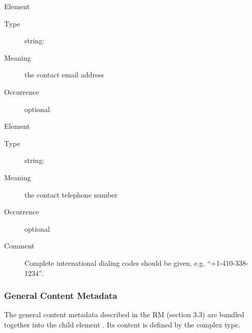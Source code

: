 \documentclass[11pt,a4paper]{ivoa}
\begin{document}
\begin{generated}
\begin{bigdescription}
\begin{description}
\end{description}
\item[Element \xmlel{email}]
\begin{description}
\item[Type] string: 
\item[Meaning] the contact email address
\item[Occurrence] optional

\end{description}
\item[Element \xmlel{telephone}]
\begin{description}
\item[Type] string: 
\item[Meaning] the contact telephone number
\item[Occurrence] optional
\item[Comment] 
                Complete international dialing codes should be given, e.g.
                “+1-410-338-1234”.
              

\end{description}


\end{bigdescription}\endgroup

\endgroup
\end{generated}




\subsubsection{General Content Metadata}


The general content metadata described in the RM
(section 3.3) are bundled together into the 
child element .  Its content is
defined by the  complex type.
\end{document}
